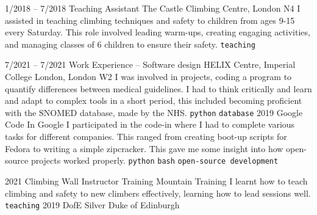 \documentclass[9pt]{developercv} %
\begin{document}
\vspace{-10 pt}
\begin{entrylist}
	\entry
		{1/2018 -- 7/2018}
		{Teaching Assistant}
		{The Castle Climbing Centre, London N4}
		{
			I assisted in teaching climbing techniques and safety to children from ages 9-15 every Saturday.
			This role involved leading warm-ups, creating engaging activities, and managing classes of 6 children to ensure their safety.
			\newline
			\texttt{teaching}
		}
\end{entrylist}


\vspace{-10 pt}
\begin{entrylist}
	\entry
	{7/2021 -- 7/2021}
	{Work Experience – Software design}
	{HELIX Centre, Imperial College London, London W2}
	{
		I was involved in projects, coding a program to quantify differences between medical guidelines.
		I had to think critically and learn and adapt to complex tools in a short period, this included becoming proficient with the SNOMED database, made by the NHS. 
		\newline
		\texttt{python} \slashsep \texttt{database}
	}
	\entry
        {2019}
		{Google Code In}
		{Google}
		{
			I participated in the code-in where I had to complete various tasks for different companies. 
			This ranged from creating boot-up scripts for Fedora to writing a simple zipcracker. 
			This gave me some insight into how open-source projects worked properly. 
        	\newline
			\texttt{python} \slashsep \texttt{bash} \slashsep \texttt{open-source development}
		}
\end{entrylist}


\vspace{-10 pt}
\begin{entrylist}
	\entry
        {2021}
		{Climbing Wall Instructor Training}
		{Mountain Training}
		{ 
			I learnt how to teach climbing and safety to new climbers effectively, learning how to lead sessions well. 
			\newline
        	\texttt{teaching}
		}
	\entry
        {2019}
		{DofE Silver}
		{Duke of Edinburgh}
		{ 
		}
\end{entrylist}
\end{document}
